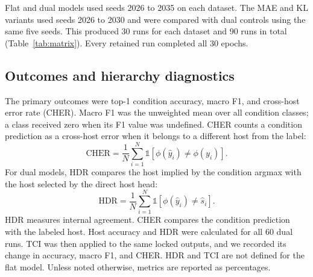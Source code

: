 \documentclass[preprint,12pt]{elsarticle}
\begin{document}
Flat and dual models used seeds 2026 to 2035 on each dataset. The MAE and KL
variants used seeds 2026 to 2030 and were compared with dual controls using the
same five seeds. This produced 30 runs for each dataset and 90 runs in total
(Table~\ref{tab:matrix}). Every retained run completed all 30 epochs.

\begin{table}[htbp]
\centering
\caption{Experiment matrix. Each seed represents a separate fine-tuning run.}
\label{tab:matrix}
\small
{}
\end{table}

\subsection{Outcomes and hierarchy diagnostics}
\label{sec:outcomes}

The primary outcomes were top-1 condition accuracy, macro F1, and cross-host
error rate (CHER). Macro F1 was the unweighted mean over all condition classes;
a class received zero when its F1 value was undefined. CHER counts a condition
prediction as a cross-host error when it belongs to a different host from the
label:
\begin{equation}
 \mathrm{CHER}=\frac{1}{N}\sum_{i=1}^{N}
 \mathbb 1[\phi(\hat y_i)\ne\phi(y_i)].
 \label{eq:cher}
\end{equation}
For dual models, HDR compares the host implied by the condition argmax with the
host selected by the direct host head:
\begin{equation}
 \mathrm{HDR}=\frac{1}{N}\sum_{i=1}^{N}
 \mathbb 1[\phi(\hat y_i)\ne\hat s_i].
 \label{eq:hdr}
\end{equation}
HDR measures internal agreement. CHER compares the condition prediction with
the labeled host. Host accuracy and HDR were calculated for all 60 dual runs.
TCI was then applied to the same locked outputs, and we recorded its change in
accuracy, macro F1, and CHER. HDR and TCI are not defined for the flat model.
Unless noted otherwise, metrics are reported as percentages.
\end{document}
